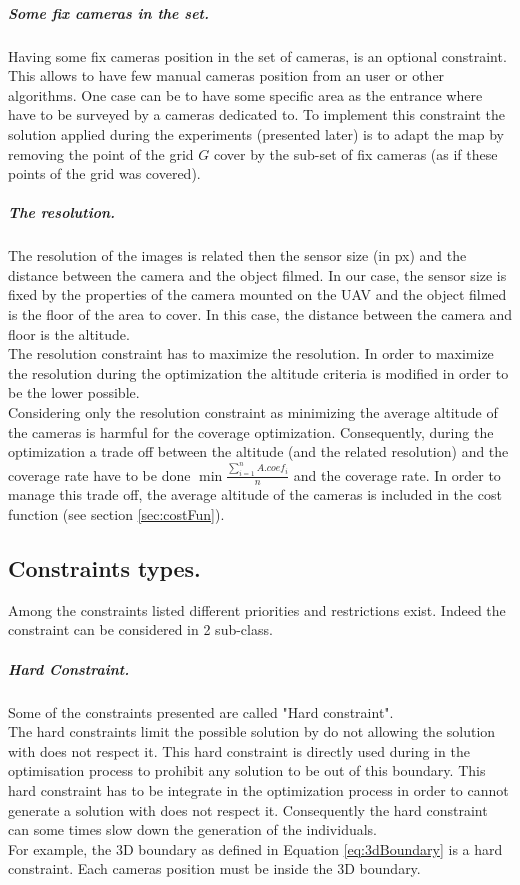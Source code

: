 \subparagraph{Some fix cameras in the set.}
Having some fix cameras position in the set of cameras, is an optional constraint. This allows to have few manual cameras position from an user or other algorithms.
One case can be to have some specific area as the entrance where have to be surveyed by a cameras dedicated to.  
To implement this constraint the solution applied during the experiments (presented later) is to adapt the map by removing the point of the grid $G$ cover by the sub-set of fix cameras (as if these points of the grid was covered).

\subparagraph{The resolution.}
The resolution of the images is related then the sensor size (in px) and the distance between the camera and the object filmed. In our case, the sensor size is fixed by the properties of the camera mounted on the UAV and the object filmed is the floor of the area to cover. In this case, the distance between the camera and floor is the altitude. \\
The resolution constraint has to maximize the resolution. In order to maximize the resolution during the optimization the altitude criteria is modified in order to be the lower possible.\\
Considering only the resolution constraint as minimizing the average altitude of the cameras is harmful for the coverage optimization.
Consequently, during the optimization a trade off between the altitude (and the related resolution) and the coverage rate have to be done $\min{\frac{\sum^n_{i=1}{A.coef_i}}{n}}$ and the coverage rate. In order to manage this trade off, the average altitude of the cameras is included in the cost function (see section  \ref{sec:costFun}).  
 
\subsection{Constraints types.}
 
Among the constraints listed different priorities and restrictions exist. Indeed the constraint can be considered in 2 sub-class. 

\subparagraph{Hard Constraint.}
 Some of the constraints presented are called "Hard constraint". \\
 The hard constraints limit the possible solution by do not allowing the solution with does not respect it. This hard constraint is directly used during in the optimisation process to prohibit any solution to be out of this boundary. This hard constraint has to be integrate in the optimization process in order to cannot generate a solution with does not respect it. Consequently the hard constraint can some times slow down the generation of the individuals.\\ 
 For example, the 3D boundary as defined in Equation \ref{eq:3dBoundary} is a hard constraint. Each cameras position must be inside the 3D boundary.\\
 
